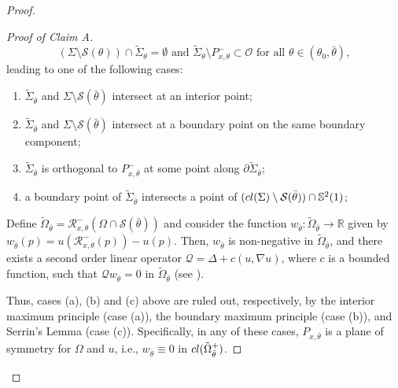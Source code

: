 \documentclass[11pt]{article}
\numberwithin{equation} {section}
\begin{document}
\begin{proof}
\begin{proof}[Proof of Claim A]
$$\left(\Sigma \setminus \mathcal{S}(\theta)\right) \cap \widetilde{\Sigma}_\theta = \emptyset \text{ and } \widetilde{\Sigma}_\theta \setminus P^-_{x,\theta} \subset \mathcal{O} \text{ for all } \theta \in (\theta_0, \bar{\theta}),$$leading to one of the following cases:
				
\begin{enumerate}
	\item[(a)] $\widetilde{\Sigma}_{\bar{\theta}}$ and $\Sigma \setminus \mathcal{S}(\bar{\theta})$ intersect at an interior point;
	\item[(b)] $\widetilde{\Sigma}_{\bar{\theta}}$ and $\Sigma \setminus \mathcal{S}(\bar{\theta})$ intersect at a boundary point on the same boundary component;
	\item[(c)] $\widetilde{\Sigma}_{\bar{\theta}}$ is orthogonal to $P^-_{x,\bar{\theta}}$ at some point along $\partial \tilde{\Sigma}_{\bar{\theta}}$;
	\item[(d)] a boundary point of $\widetilde{\Sigma}_{\bar{\theta}}$ intersects a point of $(\textup{cl}(\Sigma) \setminus \mathcal{S}(\bar{\theta}) ) \cap \mathbb{S}^2(1)$;
\end{enumerate}

		
		Define $\widetilde{\Omega}_{\bar{\theta}} = \mathcal{R}^-_{x,\theta}\left( \Omega \cap \mathcal{S}(\bar{\theta}) \right)$ and consider the function  $w_{\bar{\theta}} : \widetilde{\Omega}_{\bar{\theta}} \to \mathbb{R}$ given by $w_{\bar{\theta}}(p) = u\left( \mathcal{R}^-_{x,\theta}(p) \right) - u(p)$. Then, $w_{\bar{\theta}}$ is non-negative in $\widetilde{\Omega}_{\bar{\theta}}$, and there exists a second order linear operator $\mathcal{Q} = \Delta + c(u, \nabla u)$, where $ c $ is a bounded function, such that  $\mathcal{Q} w_{\bar{\theta}} = 0$  in $\widetilde{\Omega}_{\bar{\theta}} $ (see \cite{GT}).
		
		Thus, cases (a), (b) and (c) above are ruled out, respectively, by the interior maximum principle (case (a)), the boundary maximum principle (case (b)), and Serrin's Lemma (case (c)). Specifically, in any of these cases, $P_{x,\bar\theta}$ is a plane of symmetry for $\Omega $ and $u$, i.e., $w_{\bar \theta} \equiv 0 $ in $\textup{cl}( \tilde \Omega^+ _{\bar \theta})$.


\end{proof}
\end{proof}
\end{document}
